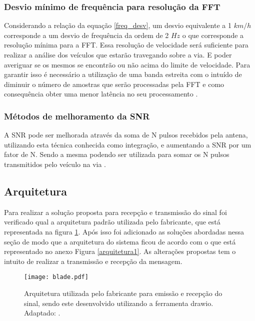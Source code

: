 \subsubsection{Desvio mínimo de frequência para resolução da FFT}
 Considerando a relação da equação \ref{freq_desv}, um desvio equivalente a 1 $km/h$ corresponde a um desvio de frequência da ordem de 2 $Hz$ o que corresponde a resolução mínima para a FFT. Essa resolução de velocidade será suficiente para realizar a análise dos veículos que estarão travegando sobre a via. E poder averiguar se os mesmos se encontrão ou não acima do limite de velocidade. Para garantir isso é necessário a utilização de uma banda estreita com o intuído de diminuir o número de amostras que serão processadas pela FFT e como consequência obter uma menor latência no seu processamento \cite{fft}.
\subsubsection{Métodos de melhoramento da SNR}%
A SNR pode ser melhorada através da soma de N pulsos recebidos pela antena, utilizando esta técnica conhecida como integração, %
e aumentando a SNR por um fator de N. Sendo a mesma podendo ser utilizada para somar os N pulsos transmitidos pelo veículo na via \cite{richards}.
\subsection{Arquitetura}
Para realizar a solução proposta para recepção e transmissão do sinal foi verificado qual a arquitetura padrão utilizada pelo fabricante, que está representada na figura \ref{arquitetura}. Após isso foi adicionado as soluções abordadas nessa seção de modo que a arquitetura do sistema ficou de acordo com o que está representado no anexo  Figura \ref{arquitetura1}. As alterações propostas tem o intuito de realizar a transmissão e recepção da mensagem. \cite{pedroni}
\begin{figure}[H]
    \centering
   \texttt{[image: blade.pdf]}
   \caption{Arquitetura utilizada pelo fabricante para emissão e recepção do sinal, sendo este desenvolvido utilizando a ferramenta drawio. Adaptado:  \cite{hosted}.}
   \label{arquitetura}
    \end{figure} 
